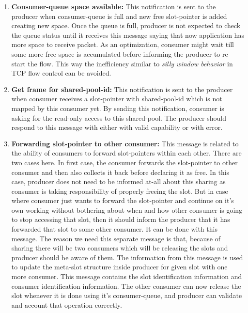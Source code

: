 \documentclass[a4paper,twoside]{report} %
\begin{document}
\begin{enumerate} 
  \item \textbf{Consumer-queue space available:} This notification is
  sent to the producer when consumer-queue is full and new free slot-pointer is
  added creating new space.  Once the queue is full, producer is not expected to check
  the queue status until it receives this message saying that now
  application has more space to receive packet.  As an optimization,
  consumer might wait till some more free-space is accumulated before
  informing the producer to re-start the flow.  This way the
  inefficiency similar to \textit{silly window behavior} in TCP 
  flow control can be avoided.

  \item \textbf{Get frame for shared-pool-id:} This notification is
  sent to the producer when consumer receives a slot-pointer with 
  shared-pool-id which is not mapped by this consumer yet.  By
  sending this notification, consumer is asking for the read-only
  access to this shared-pool.  The producer should respond to
  this message with either with valid capability or with error.

  \item \textbf{Forwarding slot-pointer to other consumer:}  
  \label{slot-forward} 
  This message is related to the ability of consumers to forward
  slot-pointers within each other.  There are two cases here.  In
  first case, the consumer forwards the slot-pointer to other 
  consumer and then also collects it back before declaring it as free.
  In this case, producer does not need to be informed at-all about
  this sharing as consumer is taking responsibility of properly
  freeing the slot.  But in case where consumer just wants to forward the
  slot-pointer and continue on it's own working without bothering
  about when and how other consumer is going to stop accessing 
  that slot, then it should inform the producer that it has forwarded
  that slot to some other consumer.  It can be done with this
  message.  The reason we need this separate message is that, 
  because of sharing there will be two consumers which will be 
  releasing the slots and producer should be aware of them.  
  The information from this message is used to update the 
  meta-slot structure inside producer for given slot with one more consumer.
  This message contains the slot identification information
  and consumer identification information.  The other consumer can 
  now release the slot whenever it is done using it's consumer-queue,
  and producer can validate and account that operation correctly.



\end{enumerate}
\end{document}
